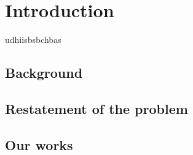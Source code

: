 \section{Introduction}
udhiisbsbchbas
\subsection{Background}
\subsection{Restatement of the problem}
\subsection{Our works}